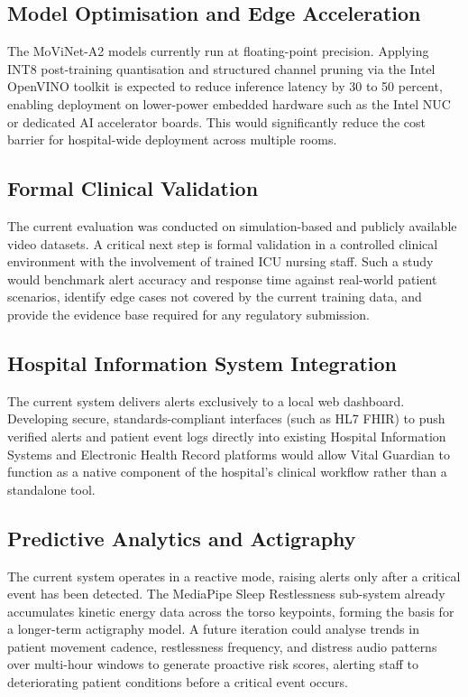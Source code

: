\subsection{Model Optimisation and Edge Acceleration}

The MoViNet-A2 models currently run at floating-point precision. Applying INT8
post-training quantisation and structured channel pruning via the Intel OpenVINO
toolkit is expected to reduce inference latency by 30 to 50 percent, enabling
deployment on lower-power embedded hardware such as the Intel NUC or dedicated
AI accelerator boards. This would significantly reduce the cost barrier for
hospital-wide deployment across multiple rooms.

\subsection{Formal Clinical Validation}

The current evaluation was conducted on simulation-based and publicly available
video datasets. A critical next step is formal validation in a controlled clinical
environment with the involvement of trained ICU nursing staff. Such a study would
benchmark alert accuracy and response time against real-world patient scenarios,
identify edge cases not covered by the current training data, and provide the
evidence base required for any regulatory submission.

\subsection{Hospital Information System Integration}

The current system delivers alerts exclusively to a local web dashboard.
Developing secure, standards-compliant interfaces (such as HL7 FHIR) to push
verified alerts and patient event logs directly into existing Hospital Information
Systems and Electronic Health Record platforms would allow Vital Guardian to
function as a native component of the hospital's clinical workflow rather than a
standalone tool.

\subsection{Predictive Analytics and Actigraphy}

The current system operates in a reactive mode, raising alerts only after a
critical event has been detected. The MediaPipe Sleep Restlessness sub-system
already accumulates kinetic energy data across the torso keypoints, forming the
basis for a longer-term actigraphy model. A future iteration could analyse trends
in patient movement cadence, restlessness frequency, and distress audio patterns
over multi-hour windows to generate proactive risk scores, alerting staff to
deteriorating patient conditions before a critical event occurs.
